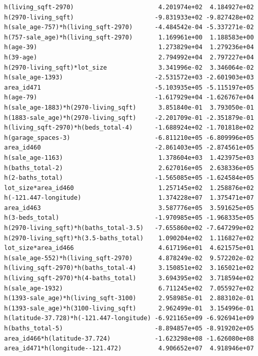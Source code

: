 \documentclass[
]{article}
\begin{document}
\begin{verbatim}
h(living_sqft-2970)                       4.201974e+02  4.184927e+02
h(2970-living_sqft)                      -9.831933e+02 -9.827428e+02
h(sale_age-757)*h(living_sqft-2970)      -4.484542e-04 -5.337271e-02
h(757-sale_age)*h(living_sqft-2970)       1.169961e+00  1.188583e+00
h(age-39)                                 1.273829e+04  1.279236e+04
h(39-age)                                 2.794992e+04  2.797227e+04
h(2970-living_sqft)*lot_size              3.341996e-02  3.346064e-02
h(sale_age-1393)                         -2.531572e+03 -2.601903e+03
area_id471                               -5.103935e+05 -5.115197e+05
h(age-79)                                -1.617929e+04 -1.626767e+04
h(sale_age-1883)*h(2970-living_sqft)      3.851840e-01  3.793050e-01
h(1883-sale_age)*h(2970-living_sqft)     -2.201709e-01 -2.351879e-01
h(living_sqft-2970)*h(beds_total-4)      -1.688924e+02 -1.701818e+02
h(garage_spaces-3)                       -6.811210e+05 -6.809996e+05
area_id460                               -2.861403e+05 -2.874561e+05
h(sale_age-1163)                          1.378604e+03  1.423975e+03
h(baths_total-2)                          2.627016e+05  2.638336e+05
h(2-baths_total)                         -1.565085e+05 -1.624584e+05
lot_size*area_id460                       1.257145e+02  1.258876e+02
h(-121.447-longitude)                     1.374228e+07  1.375471e+07
area_id463                                3.587776e+05  3.591625e+05
h(3-beds_total)                          -1.970985e+05 -1.968335e+05
h(2970-living_sqft)*h(baths_total-3.5)   -7.655860e+02 -7.647299e+02
h(2970-living_sqft)*h(3.5-baths_total)    1.090204e+02  1.116827e+02
lot_size*area_id466                       4.617196e+01  4.621575e+01
h(sale_age-552)*h(living_sqft-2970)       4.878249e-02  9.572202e-02
h(living_sqft-2970)*h(baths_total-4)      3.150851e+02  3.165021e+02
h(living_sqft-2970)*h(4-baths_total)      3.694395e+02  3.718594e+02
h(sale_age-1932)                          6.711245e+02  7.055927e+02
h(1393-sale_age)*h(living_sqft-3100)      2.958985e-01  2.883102e-01
h(1393-sale_age)*h(3100-living_sqft)      2.962499e-01  3.154996e-01
h(latitude-37.728)*h(-121.447-longitude) -6.921165e+09 -6.926941e+09
h(baths_total-5)                         -8.894857e+05 -8.919202e+05
area_id466*h(latitude-37.724)            -1.623298e+08 -1.626080e+08
area_id471*h(longitude--121.472)          4.906652e+07  4.918946e+07
                                                                    

\end{verbatim}
\end{document}
